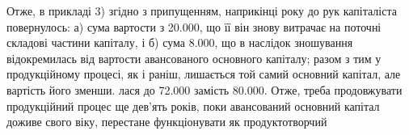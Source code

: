 Отже, в прикладі 3) згідно з припущенням, наприкінці року до рук
капіталіста повернулось: а) сума вартости з \num{20.000}, що її він
знову витрачає на поточні складові частини капіталу, і б) сума \num{8.000}, що в наслідок зношування відокремилась від вартости авансованого
основного капіталу; разом з тим у продукційному процесі, як і
раніш, лишається той самий основний капітал, але вартість його зменши.
лася до \num{72.000} замість \num{80.000}. Отже, треба продовжувати
продукційний процес ще дев’ять років, поки авансований основний
капітал доживе свого віку, перестане функціонувати як продуктотворчий
\parbreak{}  %
